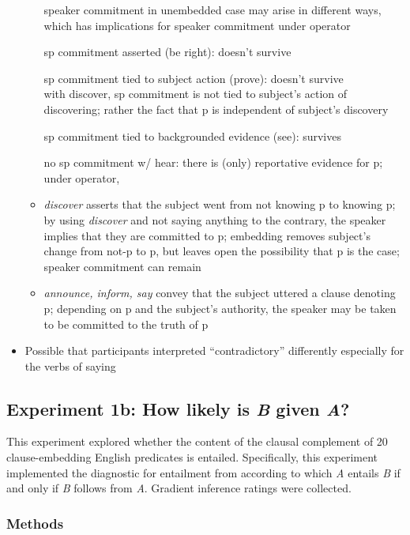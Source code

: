 \documentclass[11pt,fleqn]{article}
\newcommand{\6}{\mbox{$[\hspace*{-.6mm}[$}}
\newcommand{\9}{\mbox{$]\hspace*{-.6mm}]$}}
\begin{document}
\begin{itemize}
\begin{itemize}
speaker commitment in unembedded case may arise in different ways, which has implications for speaker commitment under operator

sp commitment asserted (be right): doesn't survive

sp commitment tied to subject action (prove): doesn't survive
\\ with discover, sp commitment is not tied to subject's action of discovering; rather the fact that p is independent of subject's discovery

sp commitment tied to backgrounded evidence (see): survives

no sp commitment w/ hear: there is (only) reportative evidence for p; under operator, 

\item {\em discover} asserts that the subject went from not knowing p to knowing p; by using {\em discover} and not saying anything to the contrary, the speaker implies that they are committed to p; embedding removes subject's change from not-p to p, but leaves open the possibility that p is the case; speaker commitment can remain

\item {\em announce, inform, say} convey that the subject uttered a clause denoting p; depending on p and the subject's authority, the speaker may be taken to be committed to the truth of p

\end{itemize}

\item Possible that participants interpreted ``contradictory'' differently especially for the verbs of saying

\end{itemize}

\subsection{Experiment 1b: How likely is {\em B} given {\em A}?}

This experiment explored whether the content of the clausal complement of 20 clause-embedding English predicates is entailed. Specifically, this experiment implemented the diagnostic for entailment from \citealt{ccmg90} according to which {\em A} entails {\em B} if and only if {\em B} follows from {\em A}. Gradient inference ratings were collected.

\subsubsection{Methods}\label{s-methods2}
\end{document}
